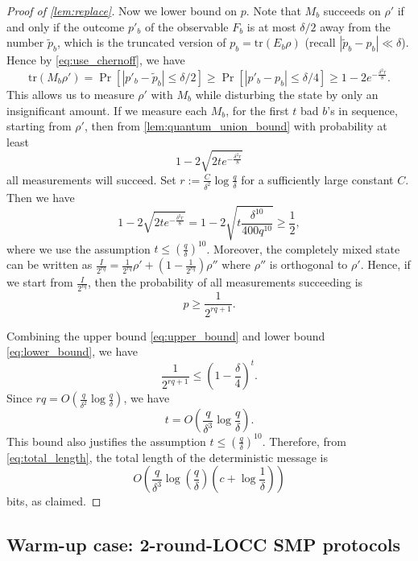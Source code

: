 \begin{proof}[Proof of \cref{lem:replace}]
    Now we lower bound on $p$. Note that $M_b$ succeeds on $\rho'$ if and only if the outcome $p'_b$ of the observable $F_b$ is at most $\delta/2$ away from the number $\widetilde{p}_b$, which is the truncated version of $p_b=\mathrm{tr}(E_b\rho)$ (recall $|\widetilde{p}_b-p_b|\ll \delta$). Hence by \cref{eq:use_chernoff}, we have
    \begin{equation}\label{eq:nonzero}
        \mathrm{tr}(M_b\rho')=\Pr[|p'_b-\widetilde{p}_b|\leq\delta/2]\geq \Pr[|p'_b-p_b|\leq\delta/4]\geq 1-2 e^{-\frac{\delta^2 r}{8}}.
    \end{equation}
    This allows us to measure $\rho'$ with $M_b$ while disturbing the state by only an insignificant amount. If we measure each $M_b$, for the first $t$ bad $b$'s in sequence, starting from $\rho'$, then from \cref{lem:quantum_union_bound} with probability at least 
    \[
        1-2\sqrt{2t e^{-\frac{\delta^2 r}{8}}}
    \]
    all measurements will succeed. Set $r:=\frac{C}{\delta^2}\log\frac{q}{\delta}$ for a sufficiently large constant $C$. Then we have
    \[
        1-2\sqrt{2t e^{-\frac{\delta^2 r}{8}}} = 1-2\sqrt{t \frac{\delta^{10}}{400 q^{10}}} \geq \frac{1}{2},
    \]
    where we use the assumption $t \leq (\frac{q}{\delta})^{10}$. Moreover, the completely mixed state can be written as $\frac{I}{2^{rq}}=\frac{1}{2^{rq}}\rho'+(1-\frac{1}{2^{rq}})\rho''$ where $\rho''$ is orthogonal to $\rho'$. Hence, if we start from $\frac{I}{2^{rq}}$, then the probability of all measurements succeeding is 
    \begin{equation}\label{eq:lower_bound}
        p\geq \frac{1}{2^{rq+1}}.
    \end{equation}

    Combining the upper bound \cref{eq:upper_bound} and lower bound \cref{eq:lower_bound}, we have
    \[
        \frac{1}{2^{rq+1}} \leq \left(1-\frac{\delta}{4} \right)^t.
    \]
    Since $rq = O(\frac{q}{\delta^2} \log \frac{q}{\delta})$, we have
    \[
        t = O\left(\frac{q}{\delta^3} \log \frac{q}{\delta}\right).
    \]
    This bound also justifies the assumption $t \leq (\frac{q}{\delta})^{10}$. Therefore, from \cref{eq:total_length}, the total length of the deterministic message is
    \[
        O\left(\frac{q}{\delta^3} \log \left(\frac{q}{\delta}\right) \left(c+ \log \frac{1}{\delta} \right) \right)
    \]
    bits, as claimed.
\end{proof}

\subsection{Warm-up case: 2-round-LOCC SMP protocols}\label{subsec:warm-up}

